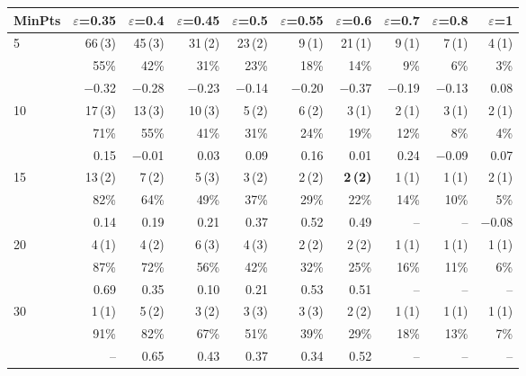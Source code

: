\begin{tabular}{@{}lrrrrrrrrr@{}}
\toprule
MinPts & $\varepsilon$=0.35 & $\varepsilon$=0.4 & $\varepsilon$=0.45 & $\varepsilon$=0.5 & $\varepsilon$=0.55 & $\varepsilon$=0.6 & $\varepsilon$=0.7 & $\varepsilon$=0.8 & $\varepsilon$=1 \\
\midrule
5 & 66\,(3) & 45\,(3) & 31\,(2) & 23\,(2) & 9\,(1) & 21\,(1) & 9\,(1) & 7\,(1) & 4\,(1) \\
 & 55\% & 42\% & 31\% & 23\% & 18\% & 14\% & 9\% & 6\% & 3\% \\
 & $-$0.32 & $-$0.28 & $-$0.23 & $-$0.14 & $-$0.20 & $-$0.37 & $-$0.19 & $-$0.13 & 0.08 \\
\midrule
10 & 17\,(3) & 13\,(3) & 10\,(3) & 5\,(2) & 6\,(2) & 3\,(1) & 2\,(1) & 3\,(1) & 2\,(1) \\
 & 71\% & 55\% & 41\% & 31\% & 24\% & 19\% & 12\% & 8\% & 4\% \\
 & 0.15 & $-$0.01 & 0.03 & 0.09 & 0.16 & 0.01 & 0.24 & $-$0.09 & 0.07 \\
\midrule
15 & 13\,(2) & 7\,(2) & 5\,(3) & 3\,(2) & 2\,(2) & \textbf{2\,(2)} & 1\,(1) & 1\,(1) & 2\,(1) \\
 & 82\% & 64\% & 49\% & 37\% & 29\% & 22\% & 14\% & 10\% & 5\% \\
 & 0.14 & 0.19 & 0.21 & 0.37 & 0.52 & 0.49 & -- & -- & $-$0.08 \\
\midrule
20 & 4\,(1) & 4\,(2) & 6\,(3) & 4\,(3) & 2\,(2) & 2\,(2) & 1\,(1) & 1\,(1) & 1\,(1) \\
 & 87\% & 72\% & 56\% & 42\% & 32\% & 25\% & 16\% & 11\% & 6\% \\
 & 0.69 & 0.35 & 0.10 & 0.21 & 0.53 & 0.51 & -- & -- & -- \\
\midrule
30 & 1\,(1) & 5\,(2) & 3\,(2) & 3\,(3) & 3\,(3) & 2\,(2) & 1\,(1) & 1\,(1) & 1\,(1) \\
 & 91\% & 82\% & 67\% & 51\% & 39\% & 29\% & 18\% & 13\% & 7\% \\
 & -- & 0.65 & 0.43 & 0.37 & 0.34 & 0.52 & -- & -- & -- \\
\bottomrule
\end{tabular}
